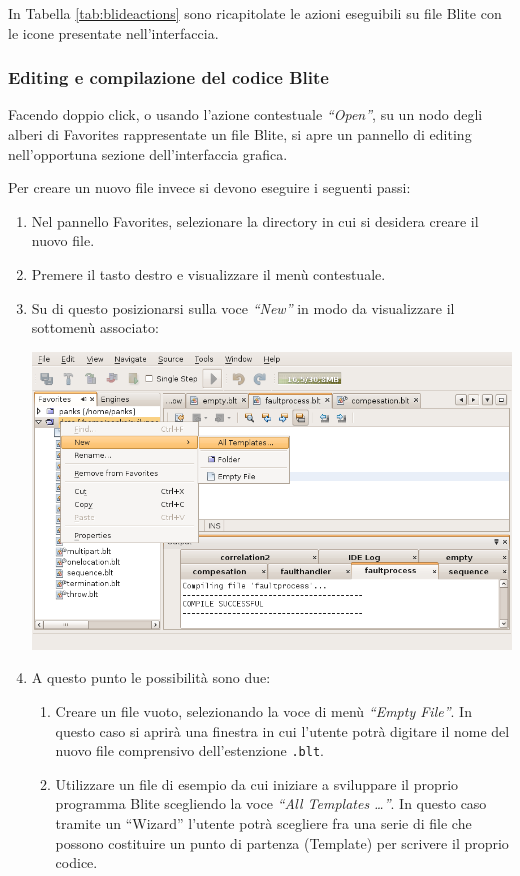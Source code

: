 In Tabella \ref{tab:blideactions} sono ricapitolate le azioni eseguibili su file Blite con le
icone presentate nell'interfaccia.

\newpage

\subsubsection*{Editing e compilazione del codice Blite}
Facendo doppio click, o usando l'azione contestuale \emph{``Open''}, su un nodo
degli alberi di Favorites rappresentate un file Blite, si apre un pannello di
editing nell'opportuna sezione dell'interfaccia grafica. 

Per creare un nuovo file invece si devono eseguire i seguenti passi:

\begin{enumerate}
  \item Nel pannello Favorites, selezionare la directory in cui si desidera
  creare il nuovo file.
  \item Premere il tasto destro e visualizzare il menù contestuale.
  \item Su di questo posizionarsi sulla voce \emph{``New''} in modo da
  visualizzare il sottomenù associato:
\begin{center}
\includegraphics[scale=0.60]{blide/dia/BlideNewFile}
\end{center}
  \item A questo punto le possibilità sono due:
\begin{enumerate}
  \item Creare un file vuoto, selezionando la voce di menù \emph{``Empty
  File''}. In questo caso si aprirà una finestra in cui l'utente potrà digitare
  il nome del nuovo file comprensivo dell'estenzione \texttt{.blt}.
  \item Utilizzare un file di esempio da cui iniziare a
  sviluppare il proprio programma Blite scegliendo la voce \emph{``All
  Templates \ldots''}. In questo caso tramite un ``Wizard'' l'utente potrà
  scegliere fra una serie di file che possono costituire un punto di partenza
  (Template) per scrivere il proprio codice.
\end{enumerate} 
\end{enumerate}

